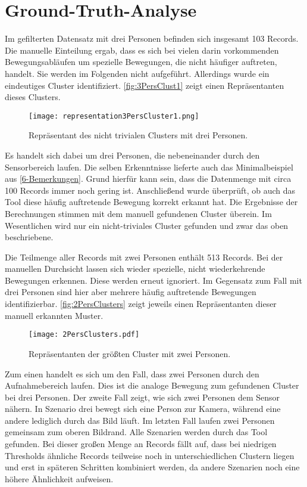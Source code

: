 \section{Ground-Truth-Analyse}
\label{6-GroundTruth}
Im gefilterten Datensatz mit drei Personen befinden sich insgesamt 103 Records.
Die manuelle Einteilung ergab,
dass es sich bei vielen darin vorkommenden Bewegungsabläufen
um spezielle Bewegungen, die nicht häufiger auftreten, handelt.
Sie werden im Folgenden nicht aufgeführt.
Allerdings wurde ein eindeutiges Cluster identifiziert.
\autoref{fig:3PersClust1} zeigt einen Repräsentanten dieses Clusters.
\begin{figure}[ht]
    \begin{center}
    \texttt{[image: representation3PersCluster1.png]}
    \end{center}
    \caption{Repräsentant des nicht trivialen Clusters mit drei Personen.}
    \label{fig:3PersClust1}
\end{figure}
Es handelt sich dabei um drei Personen, die nebeneinander durch den Sensorbereich laufen.
Die selben Erkenntnisse lieferte auch das Minimalbeispiel aus \autoref{6-Bemerkungen}.
Grund hierfür kann sein, dass die Datenmenge mit circa 100 Records immer noch gering ist.
Anschließend wurde überprüft, ob auch das Tool diese häufig auftretende Bewegung korrekt erkannt hat.
Die Ergebnisse der Berechnungen stimmen mit dem manuell gefundenen Cluster überein.
Im Wesentlichen wird nur ein nicht-triviales Cluster gefunden
und zwar das oben beschriebene.

Die Teilmenge aller Records mit zwei Personen enthält 513 Records.
Bei der manuellen Durchsicht lassen sich wieder spezielle,
nicht wiederkehrende Bewegungen erkennen.
Diese werden erneut ignoriert.
Im Gegensatz zum Fall mit drei Personen sind hier aber mehrere häufig auftretende Bewegungen identifizierbar.
\autoref{fig:2PersClusters} zeigt jeweils einen Repräsentanten dieser manuell erkannten Muster.
\begin{figure}[ht]
    \begin{center}
    \texttt{[image: 2PersClusters.pdf]}
    \end{center}
    \caption{Repräsentanten der größten Cluster mit zwei Personen.}
    \label{fig:2PersClusters}
\end{figure}
Zum einen handelt es sich um den Fall, dass zwei Personen durch den Aufnahmebereich laufen.
Dies ist die analoge Bewegung zum gefundenen Cluster bei drei Personen.
Der zweite Fall zeigt, wie sich zwei Personen dem Sensor nähern.
In Szenario drei bewegt sich eine Person zur Kamera,
während eine andere lediglich durch das Bild läuft.
Im letzten Fall laufen zwei Personen gemeinsam zum oberen Bildrand.
Alle Szenarien werden durch das Tool gefunden.
Bei dieser großen Menge an Records fällt auf,
dass bei niedrigen Thresholds ähnliche Records teilweise noch in unterschiedlichen Clustern liegen
und erst in späteren Schritten kombiniert werden,
da andere Szenarien noch eine höhere Ähnlichkeit aufweisen.

